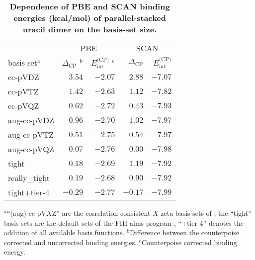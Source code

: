\begin{table}[t]
\caption{\textbf{Dependence of PBE and SCAN binding energies (kcal/mol) of parallel-stacked uracil dimer on the basis-set size.}}\label{tab:basis-sets}
\begin{tabular}{lrrrr}
\toprule
& \multicolumn{2}{c}{PBE} & \multicolumn{2}{c}{SCAN} \\
basis set$^\text{a}$ & $\Delta_\text{CP}$ $^\text{b}$ & $E_\text{int}^\text{(CP)}$ $^\text{c}$ & $\Delta_\text{CP}$ & $E_\text{int}^\text{(CP)}$ \\
\midrule
cc-pVDZ       & $3.54$  & $-2.07$ & $2.88$  & $-7.07$ \\
cc-pVTZ       & $1.42$  & $-2.63$ & $1.12$  & $-7.82$ \\
cc-pVQZ       & $0.62$  & $-2.72$ & $0.43$  & $-7.93$ \\
aug-cc-pVDZ   & $0.96$  & $-2.70$ & $1.02$  & $-7.97$ \\
aug-cc-pVTZ   & $0.51$  & $-2.75$ & $0.54$  & $-7.97$ \\
aug-cc-pVQZ   & $0.07$  & $-2.76$ & $0.00$ & $-7.98$ \\
tight         & $0.18$  & $-2.69$ & $1.19$  & $-7.92$ \\
really\_tight & $0.19$  & $-2.68$ & $0.90$  & $-7.92$ \\
tight+tier-4       & $-0.29$ & $-2.77$ & $-0.17$ & $-7.99$ \\
\bottomrule
\end{tabular}

\small
$^\text{a}$``(aug)-cc-pV$X$Z'' are the correlation-consistent $X$-zeta basis sets of \citet{DunningJCP89}, the ``tight'' basis sets are the default sets of the FHI-aims program \citep{BlumCPC09}, ``+tier-4'' denotes the addition of all available basis functions.
$^\text{b}$Difference between the counterpoise corrected and uncorrected binding energies.
$^\text{c}$Counterpoise corrected binding energy.
\end{table}

